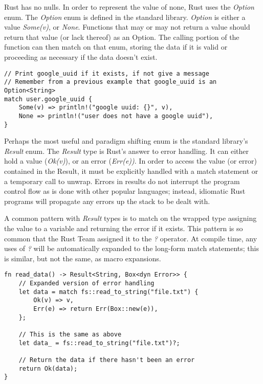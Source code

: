 \documentclass[12pt]{article}
\begin{document}
\begin{flushleft}
Rust has no nulls. In order to represent the value of none, Rust uses the
\textit{Option} enum. The \textit{Option} enum is defined in the standard
library. \textit{Option} is either a value \textit{Some(v)}, or \textit{None}.
Functions that may or may not return a value should return that value (or lack
thereof) as an Option. The calling portion of the function can then match on
that enum, storing the data if it is valid or proceeding as necessary if the
data doesn't exist.

\singlespacing{}
\begin{verbatim}
// Print google_uuid if it exists, if not give a message
// Remember from a previous example that google_uuid is an Option<String>
match user.google_uuid {
    Some(v) => println!("google uuid: {}", v),
    None => println!("user does not have a google uuid"),
}
\end{verbatim}
\doublespacing{}

Perhaps the most useful and paradigm shifting enum is the standard library's
\textit{Result} enum. The \textit{Result} type is Rust's answer to error
handling. It can either hold a value (\textit{Ok(v)}), or an error
(\textit{Err(e))}. In order to access the value (or error) contained in the
Result, it must be explicitly handled with a match statement or a temporary call
to unwrap. Errors in results do not interrupt the program control flow as is
done with other popular languages; instead, idiomatic Rust programs will propagate
any errors up the stack to be dealt with.

A common pattern with \textit{Result} types is to match on the wrapped type
assigning the value to a variable and returning the error if it exists. This
pattern is so common that the Rust Team assigned it to the \textit{?} operator.
At compile time, any uses of \textit{?} will be automatically expanded to the
long-form match statements; this is similar, but not the same, as macro
expansions.

\singlespacing{}
\begin{verbatim}
fn read_data() -> Result<String, Box<dyn Error>> {
    // Expanded version of error handling
    let data = match fs::read_to_string("file.txt") {
        Ok(v) => v,
        Err(e) => return Err(Box::new(e)),
    };

    // This is the same as above
    let data_ = fs::read_to_string("file.txt")?;

    // Return the data if there hasn't been an error
    return Ok(data);
}
\end{verbatim}
\doublespacing{}


\end{flushleft}
\end{document}
